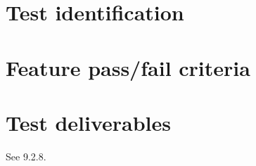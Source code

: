 \section{Test identification} \label{s:details-of-the-level-test-design:test-identification}
	\begin{comment}
		List the identifier and a brief description of each test case (or set of related test cases) in scenarios for
		this design. A particular test case, scenario, or procedure may be identified in more than one LTD. List
		the identifier and a brief description of each procedure associated with this LTD.
	\end{comment}

\section{Feature pass/fail criteria} \label{s:details-of-the-level-test-design:feature-pass-fail-criteria}
	\begin{comment}
		Specify the criteria to be used to determine whether the feature or feature combination has passed or
		failed. This is commonly based on the number of anomalies found in each severity category(s). This
		section is not needed if it is covered by an MTP and there have been no subsequent changes to the
		criteria.
	\end{comment}

\section{Test deliverables} \label{s:details-of-the-level-test-design:test-deliverables}
	\begin{comment}
		Identify all information that is to be delivered by the test activity (documents, data, etc.). The following
		documents may be included:
		⎯ Level Test Plan(s)
		⎯ Level Test Design(s)
		⎯ Level Test Cases
		⎯ Level Test Procedures
		⎯ Level Test Logs
		⎯ Anomaly Reports
		⎯ Level Interim Test Status Report(s)
		⎯ Level Test Report(s)
		⎯ Master Test Report
		Test input data and test output data may be identified as deliverables. Test tools may also be included.
		If documents have been combined or eliminated, then this list will be modified accordingly.
		Describe the process of delivering the completed information to the individuals (preferably by position,
		not name) and organizational entities that will need it. This may be a reference to a Configuration
		Management Plan. This delivery process description is not required if it is covered by the MTP and
		there are no changes
	\end{comment}
See 9.2.8.